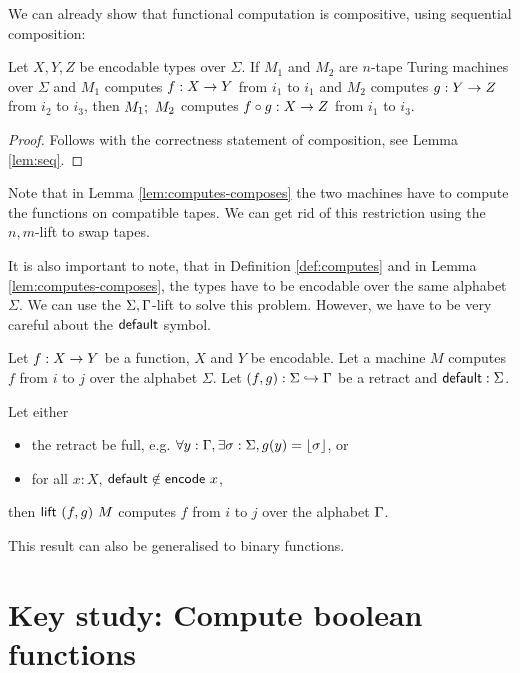 \documentclass{psartcl}
\begin{document}
We can already show that functional computation is compositive, using sequential composition:
\begin{lemma}
  \label{lem:computes-composes}
  Let $X, Y, Z$ be encodable types over $\Sigma$.  If $M_1$ and $M_2$ are $n$-tape Turing machines over $\Sigma$ and $M_1$ computes
  $f : X \rightarrow Y$ from $i_1$ to $i_1$ and $M_2$ computes $g : Y \rightarrow Z$ from $i_2$ to $i_3$,
  then $M_1 ;~ M_2$ computes $f \circ g : X \rightarrow Z$ from $i_1$ to $i_3$.
\end{lemma}
\begin{proof}
  Follows with the correctness statement of composition, see Lemma \ref{lem:seq}.
\end{proof}

Note that in Lemma \ref{lem:computes-composes} the two machines have to compute the functions on compatible tapes.
We can get rid of this restriction using the $n,m$-lift to swap tapes.

It is also important to note, that in Definition \ref{def:computes} and in Lemma \ref{lem:computes-composes}, the types have to be encodable over the
same alphabet $\Sigma$.  We can use the $\Sigma,\Gamma$-lift to solve this problem.  However, we have to be very careful about the $\textsf{default}$
symbol.

\begin{lemma}
  \label{lem:change-alphabet}
  Let $f : X \rightarrow Y$ be a function, $X$ and $Y$ be encodable.
  Let a machine $M$ computes $f$ from $i$ to $j$ over the alphabet $\Sigma$.
  Let $(f,g) : \Sigma \hookrightarrow \Gamma$ be a retract and $\textsf{default} : \Sigma$.

  Let either
  \begin{itemize}
    \item the retract be full, e.g. $\forall y:\Gamma, \exists \sigma:\Sigma, g(y) = \left\lfloor {\sigma}\right\rfloor$, or
    \item for all $x : X$, $\textsf{default} \notin \textsf{encode}~x$,
  \end{itemize}
  then $\textsf{lift}~(f,g)~M$ computes $f$ from $i$ to $j$ over the alphabet $\Gamma$.
\end{lemma}

This result can also be generalised to binary functions.


\section{Key study: Compute boolean functions}
\label{sec:bool-tm}
\end{document}
